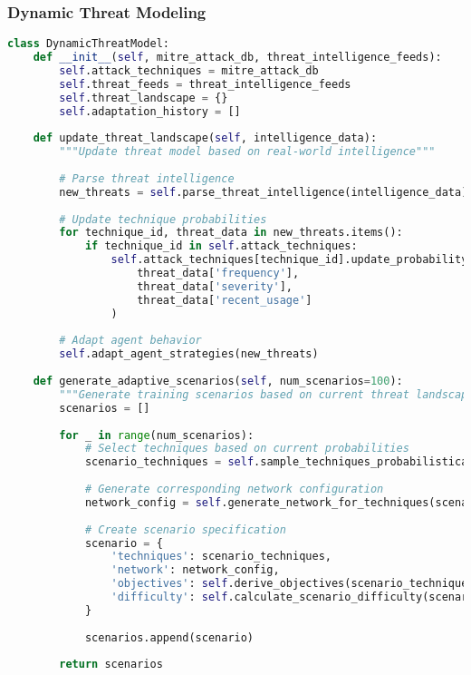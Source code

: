\documentclass[12pt,a4paper]{article}
\begin{document}
\subsubsection{Dynamic Threat Modeling}
\begin{lstlisting}[language=Python, caption=Dynamic Threat Modeling System]
class DynamicThreatModel:
    def __init__(self, mitre_attack_db, threat_intelligence_feeds):
        self.attack_techniques = mitre_attack_db
        self.threat_feeds = threat_intelligence_feeds
        self.threat_landscape = {}
        self.adaptation_history = []
    
    def update_threat_landscape(self, intelligence_data):
        """Update threat model based on real-world intelligence"""
        
        # Parse threat intelligence
        new_threats = self.parse_threat_intelligence(intelligence_data)
        
        # Update technique probabilities
        for technique_id, threat_data in new_threats.items():
            if technique_id in self.attack_techniques:
                self.attack_techniques[technique_id].update_probability(
                    threat_data['frequency'],
                    threat_data['severity'],
                    threat_data['recent_usage']
                )
        
        # Adapt agent behavior
        self.adapt_agent_strategies(new_threats)
    
    def generate_adaptive_scenarios(self, num_scenarios=100):
        """Generate training scenarios based on current threat landscape"""
        scenarios = []
        
        for _ in range(num_scenarios):
            # Select techniques based on current probabilities
            scenario_techniques = self.sample_techniques_probabilistically()
            
            # Generate corresponding network configuration
            network_config = self.generate_network_for_techniques(scenario_techniques)
            
            # Create scenario specification
            scenario = {
                'techniques': scenario_techniques,
                'network': network_config,
                'objectives': self.derive_objectives(scenario_techniques),
                'difficulty': self.calculate_scenario_difficulty(scenario_techniques)
            }
            
            scenarios.append(scenario)
        
        return scenarios
\end{lstlisting}
\end{document}
